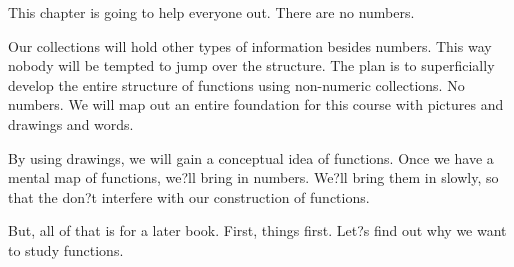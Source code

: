 \documentclass{ximera}
\begin{document}
This chapter is going to help everyone out.  There are no numbers.  

Our collections will hold other types of information besides numbers. This way nobody will be tempted to jump over the structure. 
 The plan is to superficially develop the entire structure of functions using non-numeric collections. No numbers. We will map out an entire foundation for this course with pictures and drawings and words. 

By using drawings, we will gain a conceptual idea of functions.  Once we have a mental map of functions, we?ll bring in numbers. We?ll bring them in slowly, so that the don?t interfere with our construction of functions.

But, all of that is for a later book.  First, things first.  Let?s find out why we want to study functions.
\end{document}
